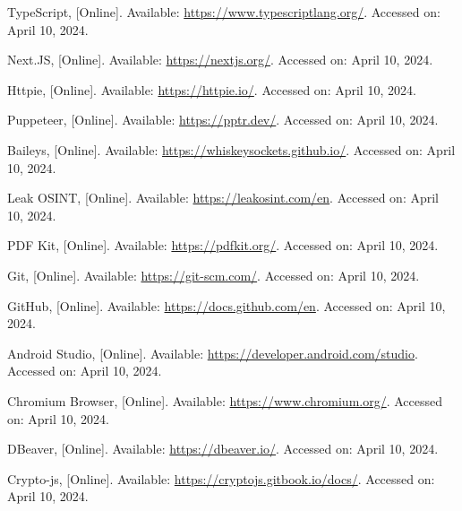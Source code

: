 \begin{thebibliography}{1}
    TypeScript, [Online]. Available: \url{https://www.typescriptlang.org/}. Accessed on: April 10, 2024.

    Next.JS, [Online]. Available: \url{https://nextjs.org/}. Accessed on: April 10, 2024.

    Httpie, [Online]. Available: \url{https://httpie.io/}. Accessed on: April 10, 2024.

    Puppeteer, [Online]. Available: \url{https://pptr.dev/}. Accessed on: April 10, 2024.

    Baileys, [Online]. Available: \url{https://whiskeysockets.github.io/}. Accessed on: April 10, 2024.

    Leak OSINT, [Online]. Available: \url{https://leakosint.com/en}. Accessed on: April 10, 2024.

    PDF Kit, [Online]. Available: \url{https://pdfkit.org/}. Accessed on: April 10, 2024.

    Git, [Online]. Available: \url{https://git-scm.com/}. Accessed on: April 10, 2024.
    
    GitHub, [Online]. Available: \url{https://docs.github.com/en}. Accessed on: April 10, 2024.
    
    Android Studio, [Online]. Available: \url{https://developer.android.com/studio}. Accessed on: April 10, 2024.
    
    Chromium Browser, [Online]. Available: \url{https://www.chromium.org/}. Accessed on: April 10, 2024.
    
    DBeaver, [Online]. Available: \url{https://dbeaver.io/}. Accessed on: April 10, 2024.
    
    Crypto-js, [Online]. Available: \url{https://cryptojs.gitbook.io/docs/}. Accessed on: April 10, 2024.
    
\end{thebibliography}